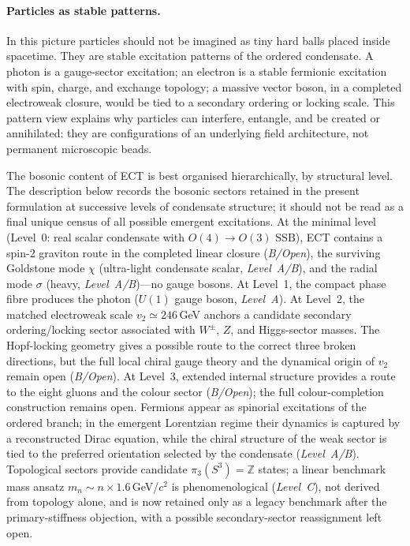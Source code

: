 \documentclass[11pt,a4paper]{article}
\begin{document}
\paragraph{Particles as stable patterns.}
In this picture particles should not be imagined as tiny hard balls placed inside spacetime. They are stable excitation patterns of the ordered condensate. A photon is a gauge-sector excitation; an electron is a stable fermionic excitation with spin, charge, and exchange topology; a massive vector boson, in a completed electroweak closure, would be tied to a secondary ordering or locking scale. This pattern view explains why particles can interfere, entangle, and be created or annihilated: they are configurations of an underlying field architecture, not permanent microscopic beads.

The bosonic content of ECT is best organised hierarchically, by structural level. The description below records the bosonic sectors retained in the present formulation at successive levels of condensate structure; it should not be read as a final unique census of all possible emergent excitations. At the minimal level (Level~0: real scalar condensate with $O(4) \to O(3)$ SSB), ECT contains a spin-2 graviton route in the completed linear closure (\emph{B/Open}), the surviving Goldstone mode $\chi$ (ultra-light condensate scalar, \emph{Level~A/B}), and the radial mode $\sigma$ (heavy, \emph{Level~A/B})---no gauge bosons. At Level~1, the compact phase fibre produces the photon ($U(1)$ gauge boson, \emph{Level~A}). At Level~2, the matched electroweak scale $v_2\simeq246$\,GeV anchors a candidate secondary ordering/locking sector associated with $W^\pm$, $Z$, and Higgs-sector masses. The Hopf-locking geometry gives a possible route to the correct three broken directions, but the full local chiral gauge theory and the dynamical origin of $v_2$ remain open (\emph{B/Open}). At Level~3, extended internal structure provides a route to the eight gluons and the colour sector (\emph{B/Open}); the full colour-completion construction remains open. Fermions appear as spinorial excitations of the ordered branch; in the emergent Lorentzian regime their dynamics is captured by a reconstructed Dirac equation, while the chiral structure of the weak sector is tied to the preferred orientation selected by the condensate (\emph{Level~A/B}). Topological sectors provide candidate $\pi_3(S^3)=\mathbb{Z}$ states; a linear benchmark mass ansatz $m_n\sim n\times1.6$\,GeV/$c^2$ is phenomenological (\emph{Level~C}), not derived from topology alone, and is now retained only as a legacy benchmark after the primary-stiffness objection, with a possible secondary-sector reassignment left open.
\end{document}
